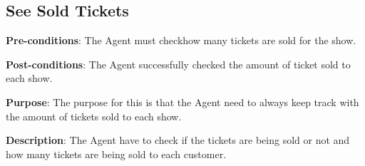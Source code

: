 \subsection{See Sold Tickets}
\textbf{Pre-conditions}: The Agent must checkhow many tickets are
sold for the show.

\textbf{Post-conditions}: The Agent successfully checked the amount
of ticket sold to each show.

\textbf{Purpose}: The purpose for this is that the Agent need to
always keep track with the amount of tickets sold to each show.

\textbf{Description}: The Agent have to check if the tickets are
being sold or not and how many tickets are being sold to each
customer.
